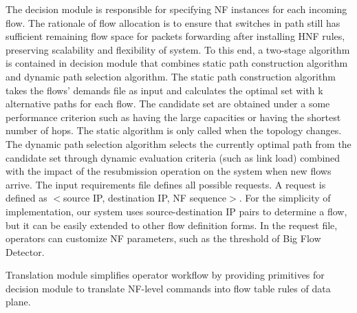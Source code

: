 \documentclass[10pt, conference, letterpaper]{IEEEtran}
\begin{document}
The decision module is responsible for specifying NF instances for each incoming flow. The rationale of flow allocation is to ensure that switches in path still has sufficient remaining flow space for packets forwarding after installing HNF rules, preserving scalability and flexibility of system. To this end, a two-stage algorithm is contained in decision module that combines static path construction algorithm and dynamic path selection algorithm.
The static path construction algorithm takes the flows' demands  file as input and calculates the optimal set with k alternative paths for each flow. The candidate set are obtained under a some performance criterion such as having the large capacities or having the shortest number of hops. The static algorithm is only called when the topology changes.
 The dynamic path selection algorithm selects the currently optimal path from the candidate set through dynamic evaluation criteria (such as link load) combined with the impact of the resubmission operation on the system when new flows arrive. 
 The input requirements file defines all possible requests. A request is defined as $<$source IP, destination IP, NF sequence$>$. For the simplicity of implementation, our system uses source-destination IP pairs to determine a flow, but it can be easily extended to other flow definition forms. In the request file, operators can customize NF parameters, such as the threshold of Big Flow Detector.


Translation module simplifies operator workflow by providing primitives for decision module to translate NF-level commands into flow table rules of data plane.
\end{document}
